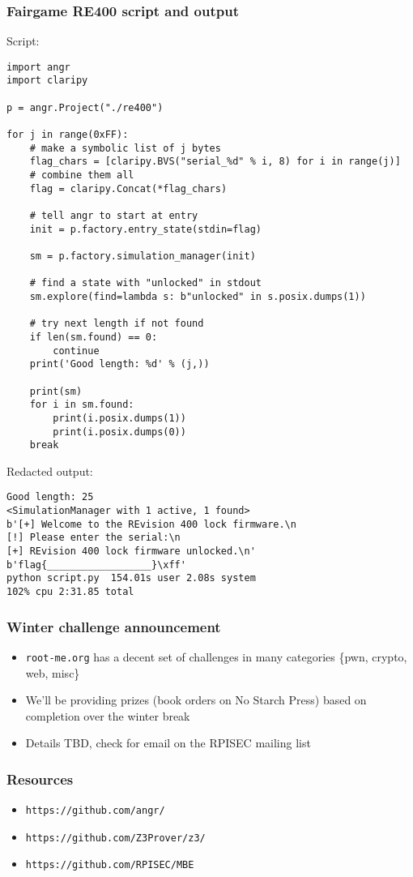 \documentclass[aspectratio=169]{beamer}
\begin{document}
\begin{frame}[fragile]
\frametitle{Fairgame RE400 script and output}
\begin{minipage}{0.55\textwidth}
Script:
\begin{Verbatim}[frame=single, fontsize=\tiny]
import angr
import claripy

p = angr.Project("./re400")

for j in range(0xFF):
    # make a symbolic list of j bytes
    flag_chars = [claripy.BVS("serial_%d" % i, 8) for i in range(j)]
    # combine them all
    flag = claripy.Concat(*flag_chars)

    # tell angr to start at entry
    init = p.factory.entry_state(stdin=flag)

    sm = p.factory.simulation_manager(init)

    # find a state with "unlocked" in stdout
    sm.explore(find=lambda s: b"unlocked" in s.posix.dumps(1))

    # try next length if not found
    if len(sm.found) == 0:
        continue
    print('Good length: %d' % (j,))

    print(sm)
    for i in sm.found:
        print(i.posix.dumps(1))
        print(i.posix.dumps(0))
    break
\end{Verbatim}
\end{minipage}
\begin{minipage}{0.44\textwidth}
Redacted output:
\begin{Verbatim}[frame=single, fontsize=\tiny]
Good length: 25
<SimulationManager with 1 active, 1 found>
b'[+] Welcome to the REvision 400 lock firmware.\n
[!] Please enter the serial:\n
[+] REvision 400 lock firmware unlocked.\n'
b'flag{__________________}\xff'
python script.py  154.01s user 2.08s system
102% cpu 2:31.85 total
\end{Verbatim}
\end{minipage}
\end{frame}


\begin{frame}[fragile]
\frametitle{Winter challenge announcement}
\begin{itemize}
\item \verb|root-me.org| has a decent set of challenges in many categories \{pwn, crypto, web, misc\}
\item We'll be providing prizes (book orders on No Starch Press) based on completion over the winter break
\item Details TBD, check for email on the RPISEC mailing list
\end{itemize}
\end{frame}

\begin{frame}[fragile]
\frametitle{Resources}
\begin{itemize}
\item \verb|https://github.com/angr/|
\item \verb|https://github.com/Z3Prover/z3/|
\item \verb|https://github.com/RPISEC/MBE|
\end{itemize}
\end{frame}
\end{document}
